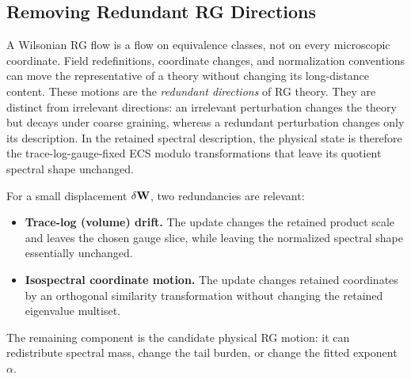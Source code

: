 \subsection{Removing Redundant RG Directions}
\label{sxn:redundant_rg_directions}

A Wilsonian RG flow is a flow on equivalence classes, not on every microscopic coordinate. Field redefinitions, coordinate changes, and normalization conventions can move the representative of a theory without changing its long-distance content. These motions are the \emph{redundant directions} of RG theory. They are distinct from irrelevant directions: an irrelevant perturbation changes the theory but decays under coarse graining, whereas a redundant perturbation changes only its description. In the retained spectral description, the physical state is therefore the trace-log-gauge-fixed ECS modulo transformations that leave its quotient spectral shape unchanged.

For a small displacement $\delta\mathbf W$, two redundancies are relevant:
\begin{itemize}
\item \textbf{Trace-log (volume) drift.} The update changes the retained product scale and leaves the chosen gauge slice, while leaving the normalized spectral shape essentially unchanged.
\item \textbf{Isospectral coordinate motion.} The update changes retained coordinates by an orthogonal similarity transformation without changing the retained eigenvalue multiset.
\end{itemize}
The remaining component is the candidate physical RG motion: it can redistribute spectral mass, change the tail burden, or change the fitted exponent $\alpha$.

